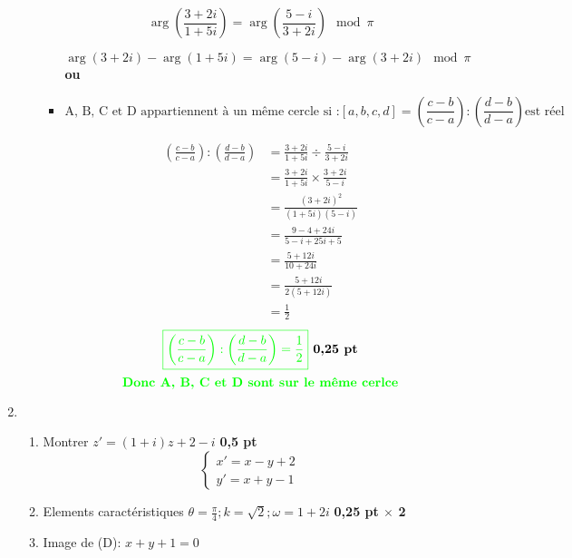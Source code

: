 \documentclass[12pt]{article}
\begin{document}
\begin{enumerate}
\begin{enumerate}
\begin{itemize}
\[
\arg \left({\frac {3+2i}{1+5i}}\right)=\arg \left({\frac {5-i}{3+2i}}\right)\mod \pi
\]

\[
\arg \left(3+2i\right)-\arg\left(1+5i\right)=\arg \left(5-i\right)-\arg\left(3+2i\right)\mod \pi
\]
\textbf{ou}
\item 
\[
\text{A, B, C et D appartiennent à un même cercle si :}\left[ a,b,c,d \right] =\left({\frac {c-b}{c-a}}\right):\left({\frac {d-b}{d-a}}\right) \text{est réel}
\]

\begin{align*}
\left({\frac {c-b}{c-a}}\right):\left({\frac {d-b}{d-a}}\right)&=\frac {3+2i}{1+5i} \div \frac {5-i}{3+2i}\\
																&=\frac {3+2i}{1+5i}\times \frac {3+2i}{5-i}\\																		&=\frac {(3+2i)^{2}}{(1+5i)(5-i)}\\
																&=\frac {9-4+24i}{5-i+25i+5}\\
																&=\frac {5+12i}{10+24i}\\
																&=\frac {5+12i}{2(5+12i)}\\
																&=\frac {1}{2}
\end{align*}
\[
\textcolor{green}{\boxed{\left({\frac {c-b}{c-a}}\right):\left({\frac {d-b}{d-a}}\right)=\frac {1}{2}}}\textbf{ 0,25 pt}
\]
\[
\textcolor{green}{\textbf{Donc A, B, C et D sont sur le même cerlce}}
\]

\end{itemize}

\end{enumerate}
\item 
\begin{enumerate}
\item Montrer $z'=(1+i)z+2-i$ \textbf{ 0,5 pt}
\[\begin{cases}
x'=x-y+2\\
y'=x+y-1
\end{cases}\]
\item Elements caractéristiques
$\theta=\frac{\pi}{4}; k=\sqrt{2}; \omega=1+2i$ \textbf{ 0,25 pt $\times$ 2}
\item Image de (D): $x+y+1=0$


\end{enumerate}
\end{enumerate}
\end{document}
